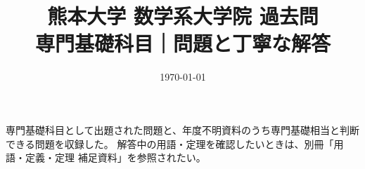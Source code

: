 \documentclass[uplatex, dvipdfmx]{jsreport}
\title{熊本大学 数学系大学院 過去問\\{\Large 専門基礎科目｜問題と丁寧な解答}}
\author{}
\date{\today}
\begin{document}
\maketitle

\begin{memo*}
専門基礎科目として出題された問題と、年度不明資料のうち専門基礎相当と判断できる問題を収録した。
解答中の用語・定理を確認したいときは、別冊「用語・定義・定理 補足資料」を参照されたい。
\end{memo*}

\tableofcontents







\end{document}
